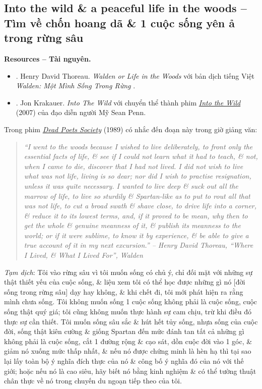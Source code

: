 \documentclass[12pt]{article}
\begin{document}
\subsection{Into the wild \& a peaceful life in the woods -- Tìm về chốn hoang dã \& 1 cuộc sống yên ả trong rừng sâu}
\textbf{\textsf{Resources -- Tài nguyên.}}
\begin{itemize}
	\item \cite{Thoreau2014}. Henry David Thoreau. {\it Walden or Life in the Woods} với bản dịch tiếng Việt {\it Walden: Một Mình Sống Trong Rừng} \cite{Thoreau2023}.
	\item \cite{Krakauer1997}. Jon Krakauer. {\it Into The Wild} với chuyển thể thành phim \href{https://www.imdb.com/title/tt0758758}{\it Into the Wild} (2007) của đạo diễn người Mỹ {\sc Sean Penn}.
\end{itemize}
Trong phim \href{https://www.imdb.com/title/tt0097165}{\it Dead Poets Society} (1989) có nhắc đến đoạn này trong giờ giảng văn:
\begin{quotation}\it
	``I went to the woods because I wished to live deliberately, to front only the essential facts of life, \& see if I could not learn what it had to teach, \& not, when I came to die, discover that I had not lived. I did not wish to live what was not life, living is so dear; nor did I wish to practise resignation, unless it was quite necessary. I wanted to live deep \& suck out all the marrow of life, to live so sturdily \& Spartan-like as to put to rout all that was not life, to cut a broad swath \& shave close, to drive life into a corner, \& reduce it to its lowest terms, and, if it proved to be mean, why then to get the whole \& genuine meanness of it, \& publish its meanness to the world; or if it were sublime, to know it by experience, \& be able to give a true account of it in my next excursion.'' -- {\sc Henry David Thoreau}, ``Where I Lived, \& What I Lived For'', Walden {\rm\cite{Thoreau2014}}
\end{quotation}
{\it Tạm dịch}: Tôi vào rừng sâu vì tôi muốn sống có chủ ý, chỉ đối mặt với những sự thật thiết yếu của cuộc sống, \& liệu xem tôi có thể học được những gì nó [đời sống trong rừng sâu] dạy hay không, \& khi chết đi, tôi mới phát hiện ra rằng mình chưa sống. Tôi không muốn sống 1 cuộc sống không phải là cuộc sống, cuộc sống thật quý giá; tôi cũng không muốn thực hành sự cam chịu, trừ khi điều đó thực sự cần thiết. Tôi muốn sống sâu sắc \& hút hết tủy sống, nhựa sống của cuộc đời, sống thật kiên cường \& giống Spartan đến mức đánh tan tất cả những gì không phải là cuộc sống, cắt 1 đường rộng \& cạo sát, dồn cuộc đời vào 1 góc, \& giảm nó xuống mức thấp nhất, \& nếu nó được chứng minh là hèn hạ thì tại sao lại lấy toàn bộ ý nghĩa đích thực của nó \& công bố ý nghĩa đó của nó với thế giới; hoặc nếu nó là cao siêu, hãy biết nó bằng kinh nghiệm \& có thể tường thuật chân thực về nó trong chuyến du ngoạn tiếp theo của tôi.
\end{document}
